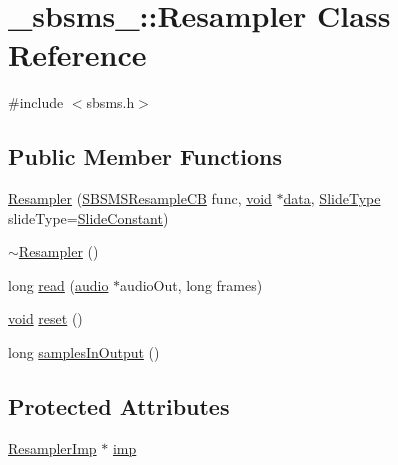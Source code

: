 \hypertarget{class__sbsms___1_1_resampler}{}\section{\+\_\+sbsms\+\_\+\+:\+:Resampler Class Reference}
\label{class__sbsms___1_1_resampler}


{\ttfamily \#include $<$sbsms.\+h$>$}

\subsection*{Public Member Functions}
\begin{DoxyCompactItemize}
\item 
\hyperlink{class__sbsms___1_1_resampler_ae54e495df1b50934e3b8d9e11f1942f2}{Resampler} (\hyperlink{namespace__sbsms___a1b88e19baa604934b1c3cdec1fae8d4b}{S\+B\+S\+M\+S\+Resample\+CB} func, \hyperlink{sound_8c_ae35f5844602719cf66324f4de2a658b3}{void} $\ast$\hyperlink{lib_2expat_8h_ac39e72a1de1cb50dbdc54b08d0432a24}{data}, \hyperlink{namespace__sbsms___a208fc16133e115cda214f563a3a19a49}{Slide\+Type} slide\+Type=\hyperlink{namespace__sbsms___a208fc16133e115cda214f563a3a19a49a380a96a0990704566ac50b5015935912}{Slide\+Constant})
\item 
\hyperlink{class__sbsms___1_1_resampler_ac2e18a3ee826fdd464d4135e454b7f02}{$\sim$\+Resampler} ()
\item 
long \hyperlink{class__sbsms___1_1_resampler_af44f462a50caf22f154177187d106059}{read} (\hyperlink{namespace__sbsms___a11786cc5bd221ff534972ae350477324}{audio} $\ast$audio\+Out, long frames)
\item 
\hyperlink{sound_8c_ae35f5844602719cf66324f4de2a658b3}{void} \hyperlink{class__sbsms___1_1_resampler_a013009c90efc360ed36e8f8117c826e6}{reset} ()
\item 
long \hyperlink{class__sbsms___1_1_resampler_a3d590d5775f173f3fafb683102bf37a0}{samples\+In\+Output} ()
\end{DoxyCompactItemize}
\subsection*{Protected Attributes}
\begin{DoxyCompactItemize}
\item 
\hyperlink{class__sbsms___1_1_resampler_imp}{Resampler\+Imp} $\ast$ \hyperlink{class__sbsms___1_1_resampler_ad381fbbfdaba6a6073aacb8f9f0828f6}{imp}
\end{DoxyCompactItemize}


